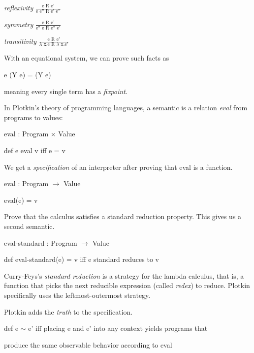 \begin{multicols}{3}
\textit{reflexivity}
$\frac{\text{e R e'}}{\text{e e'' R e' e''}}$

\textit{symmetry}
$\frac{\text{e R e'}}{\text{e'' e R e'' e'}}$

\textit{transitivity}
$\frac{\text{e R e'}}{\text{$\lambda$ x.e R $\lambda$ x.e'}}$
\end{multicols}

With an equational system, we can prove such facts as

\hspace{\parindent}
e (Y e) = (Y e)

meaning every single term has a \textit{fixpoint}.

\asterism

In Plotkin's theory of programming languages, a semantic is a relation
\textit{eval} from programs to values:

\hspace{\parindent}
eval : Program $\times$ Value

\hspace{\parindent}
def e eval v iff e = v

We get a \textit{specification} of an interpreter after proving that eval is a
function.

\hspace{\parindent}
eval : Program $\rightarrow$ Value

\hspace{\parindent}
eval(e) = v

Prove that the calculus satisfies a standard reduction property. This gives us a
second semantic.

\hspace{\parindent}
eval-standard : Program $\rightarrow$ Value

\hspace{\parindent}
def eval-standard(e) = v iff e standard reduces to v

Curry-Feys's \textit{standard reduction} is a strategy for the lambda calculus,
that is, a function that picks the next reducible expression (called
\textit{redex}) to reduce. Plotkin specifically uses the leftmost-outermost
strategy.

Plotkin adds the \textit{truth} to the specification.

\hspace{\parindent}
def e $\sim$ e' iff placing e and e' into any context yields programs that

\hspace{\parindent}
produce the same observable behavior according to eval

